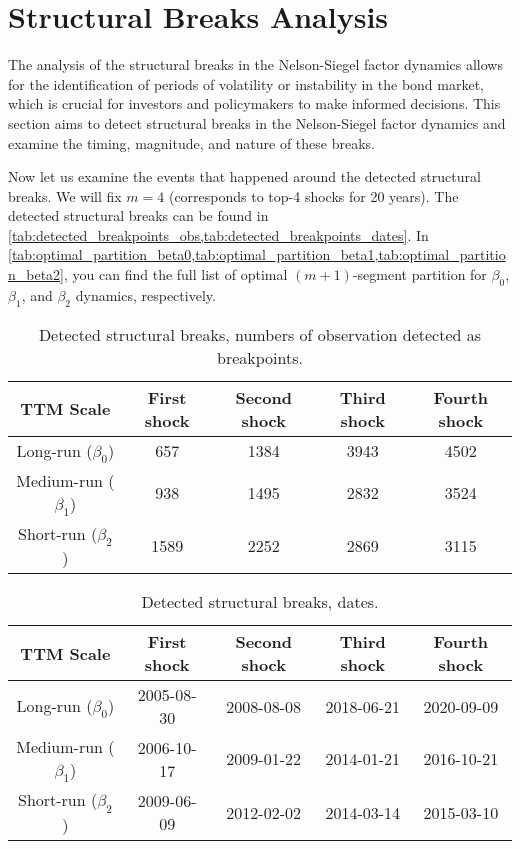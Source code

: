 \section{Structural Breaks Analysis}\label{sec:SBA}
    The analysis of the structural breaks in the Nelson-Siegel factor dynamics allows for the identification of periods of volatility or instability 
    in the bond market, which is crucial for investors and policymakers to make informed decisions. This section aims to detect structural breaks in 
    the Nelson-Siegel factor dynamics and examine the timing, magnitude, and nature of these breaks.

    
    Now let us examine the events that happened around the detected structural breaks. We will fix $m=4$ (corresponds to top-4 shocks for 20 years). 
    The detected structural breaks can be found in \cref{tab:detected_breakpoints_obs,tab:detected_breakpoints_dates}. In \cref{tab:optimal_partition_beta0,tab:optimal_partition_beta1,tab:optimal_partition_beta2}, you can find the full list of optimal $(m+1)$-segment partition for $\beta_0$, $\beta_1$, and $\beta_2$ dynamics, respectively.

    \begin{table}[!h]
        \centering
        \begin{tabular}{|c|c|c|c|c|}\hline
            TTM Scale               & First shock & Second shock & Third shock & Fourth shock \\\hline
            Long-run ($\beta_0$)    & 657         & 1384         & 3943        & 4502 \\
            Medium-run ($\beta_1$)  & 938         & 1495         & 2832        & 3524 \\
            Short-run ($\beta_2$)   & 1589        & 2252         & 2869        & 3115 \\\hline
        \end{tabular}
        \caption{Detected structural breaks, numbers of observation detected as breakpoints.}
        \label{tab:detected_breakpoints_obs}
    \end{table}

    \begin{table}[!h]
        \centering
        \begin{tabular}{|c|c|c|c|c|}\hline
            TTM Scale               & First shock & Second shock & Third shock & Fourth shock \\\hline
            Long-run ($\beta_0$)    & 2005-08-30  & 2008-08-08   & 2018-06-21  & 2020-09-09 \\
            Medium-run ($\beta_1$)  & 2006-10-17  & 2009-01-22   & 2014-01-21  & 2016-10-21 \\
            Short-run ($\beta_2$)   & 2009-06-09  & 2012-02-02   & 2014-03-14  & 2015-03-10 \\\hline
        \end{tabular}
        \caption{Detected structural breaks, dates.}
        \label{tab:detected_breakpoints_dates}
    \end{table}


